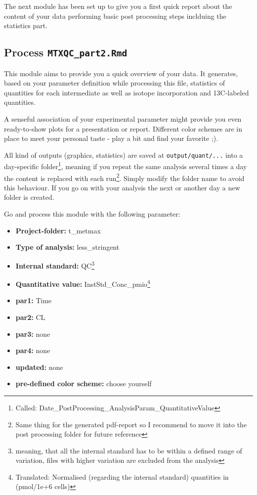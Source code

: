 \documentclass[]{book}
\providecommand{\tightlist}{%
  \setlength{\itemsep}{0pt}\setlength{\parskip}{0pt}}
\let\rmarkdownfootnote\footnote%
\def\footnote{\protect\rmarkdownfootnote}
\begin{document}
The next module has been set up to give you a first quick report about the content of your data performing basic post processing steps inclduing the statistics part.

\hypertarget{process-mtxqc_part2.rmd-1}{%
\subsection{\texorpdfstring{Process \texttt{MTXQC\_part2.Rmd}}{Process MTXQC\_part2.Rmd}}\label{process-mtxqc_part2.rmd-1}}

This module aims to provide you a quick overview of your data. It generates, based on your parameter definition while processing this file, statistics of quantities for each intermediate as well as isotope incorporation and 13C-labeled quantities.

A senseful association of your experimental parameter might provide you even ready-to-show plots for a presentation or report. Different color schemes are in place to meet your personal taste - play a bit and find your favorite ;).

All kind of outputs (graphics, statistics) are saved at \texttt{output/quant/...} into a day-specific folder\footnote{Called: Date\_PostProcessing\_AnalysisParam\_QuantitativeValue}, meaning if you repeat the same analysis several times a day the content is replaced with each run\footnote{Same thing for the generated pdf-report so I recommend to move it into the post processing folder for future reference}. Simply modify the folder name to avoid this behaviour. If you go on with your analysis the next or another day a new folder is created.

Go and process this module with the following parameter:

\begin{itemize}
\tightlist
\item
  \textbf{Project-folder:} t\_metmax
\item
  \textbf{Type of analysis:} less\_stringent
\item
  \textbf{Internal standard:} QC\footnote{meaning, that all the internal standard has to be within a defined range of variation, files with higher variation are excluded from the analysis}
\item
  \textbf{Quantitative value:} InstStd\_Conc\_pmio\footnote{Translated: Normalised (regarding the internal standard) quantities in (pmol/1e+6 cells)}
\item
  \textbf{par1:} Time
\item
  \textbf{par2:} CL
\item
  \textbf{par3:} none
\item
  \textbf{par4:} none
\item
  \textbf{updated:} none
\item
  \textbf{pre-defined color scheme:} choose yourself
\end{itemize}
\end{document}
